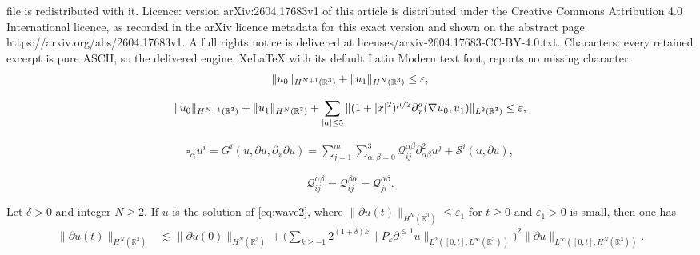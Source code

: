 \documentclass[10pt,a4paper]{amsart}
\def\R{\mathop{\mathbb R\kern 0pt}\nolimits}
\def\cQ{\mathcal Q}
\def\p{\partial}
\def\ve{\varepsilon}
\begin{document}
file is redistributed with it. Licence: version arXiv:2604.17683v1 of this article is distributed under the Creative Commons Attribution 4.0 International licence, as recorded in the arXiv licence metadata for this exact version and shown on the abstract page https://arxiv.org/abs/2604.17683v1. A full rights notice is delivered at licenses/arxiv-2604.17683-CC-BY-4.0.txt. Characters: every retained excerpt is pure ASCII, so the delivered engine, XeLaTeX with its default Latin Modern text font, reports no missing character.
\begin{equation}\label{initial:data}
\|u_{0}\|_{H^{N+1}(\R^3)}+\|u_{1}\|_{H^N(\R^3)}\le\ve,
\end{equation}

\begin{equation}\label{initial:data2}
\|u_{0}\|_{H^{N+1}(\R^3)}+\|u_1\|_{H^N(\R^3)}+\sum_{|a|\le 5}\|(1+|x|^2)^{\mu/2}\p^a_x(\nabla u _0,u_1)\|_{L^2(\R^3)}\le\ve,
\end{equation}

\begin{equation}\label{eq:wave2}
	\begin{aligned}
		\square_{c_i} u^i =G^i(u,\p u,\p_x\p u) = \sum_{j=1}^m\sum_{\alpha,\beta=0}^3 \cQ^{\alpha\beta}_{ij} \partial_{\alpha\beta}^2 u^j+\mathcal{S}^i(u,\p u),
	\end{aligned}
\end{equation}

\begin{equation}\label{eq:symmetric condition2}
	\cQ^{\alpha\beta}_{ij} =\cQ^{\beta\alpha}_{ij} =\cQ^{\alpha\beta}_{ji}.
\end{equation}

\begin{lemma}\label{lem:Energy estimate}
	Let $\delta>0$ and integer $N \geq 2$. If $u$ is the solution of \eqref{eq:wave2}, where $\|\partial u(t)\|_{H^{N}(\mathbb{R}^3)} \leq \varepsilon_1$ for $t\ge 0$ and $\varepsilon_1>0$ is small, then one has
	\begin{equation}\label{3.4}
		\begin{aligned}
			\|\partial u(t)\|_{H^{N}(\mathbb{R}^3)} &\lesssim \|\partial u(0)\|_{H^{N}(\mathbb{R}^3)}
			+ \big(\sum_{k \geq -1} 2^{(1+\delta)k} \|P_k \partial^{\le 1} u\|_{L^2([0,t];L^\infty(\mathbb{R}^3))}\big)^2 \|\partial u\|_{L^\infty([0,t];H^{N}(\mathbb{R}^3))}.
		\end{aligned}
	\end{equation}
\end{lemma}
\end{document}
